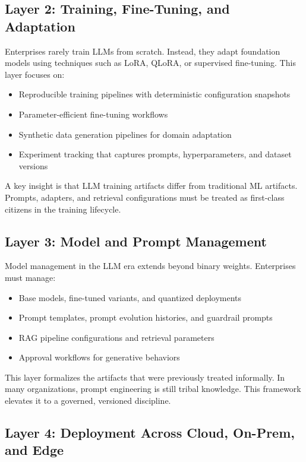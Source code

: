 \documentclass[11pt]{article}
\begin{document}
\subsection{Layer 2: Training, Fine-Tuning, and Adaptation}

Enterprises rarely train LLMs from scratch. Instead, they adapt foundation models using techniques such as LoRA, QLoRA, or supervised fine-tuning. This layer focuses on:

\begin{itemize}[leftmargin=1.2cm]
    \item Reproducible training pipelines with deterministic configuration snapshots
    \item Parameter-efficient fine-tuning workflows
    \item Synthetic data generation pipelines for domain adaptation
    \item Experiment tracking that captures prompts, hyperparameters, and dataset versions
\end{itemize}

A key insight is that LLM training artifacts differ from traditional ML artifacts. Prompts, adapters, and retrieval configurations must be treated as first-class citizens in the training lifecycle.

\subsection{Layer 3: Model and Prompt Management}

Model management in the LLM era extends beyond binary weights. Enterprises must manage:

\begin{itemize}[leftmargin=1.2cm]
    \item Base models, fine-tuned variants, and quantized deployments
    \item Prompt templates, prompt evolution histories, and guardrail prompts
    \item RAG pipeline configurations and retrieval parameters
    \item Approval workflows for generative behaviors
\end{itemize}

This layer formalizes the artifacts that were previously treated informally. In many organizations, prompt engineering is still tribal knowledge. This framework elevates it to a governed, versioned discipline.

\subsection{Layer 4: Deployment Across Cloud, On-Prem, and Edge}
\end{document}
